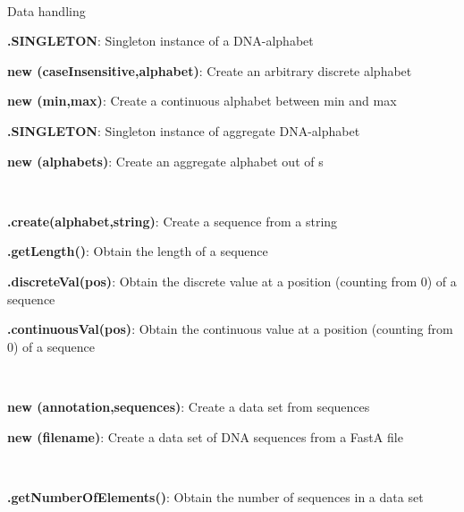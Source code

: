 \documentclass[10pt]{scrartcl}
\newcommand{\entry}[3]{{\bfseries #1#2}: #3}
\begin{document}
\thispagestyle{empty}


\renewcommand{\section}[1]{{
~\vspace{-0.1cm}

\large\sfb #1\vspace{0.1cm}\\}


}
\begin{flushleft}
\footnotesize
\section{Data handling}

\entry{\DNAAlphabet}{.SINGLETON}{Singleton instance of a DNA-alphabet}

\entry{new \DiscreteAlphabet}{(caseInsensitive,alphabet)}{Create an arbitrary discrete alphabet}

\entry{new \ContinuousAlphabet}{(min,max)}{Create a continuous alphabet between min and max}

\entry{\DNAAlphabetContainer}{.SINGLETON}{Singleton instance of aggregate DNA-alphabet}

\entry{new \AlphabetContainer}{(alphabets)}{Create an aggregate alphabet out of \Alphabet s}

~

\entry{\Sequence}{.create(alphabet,string)}{Create a sequence from a string}

\entry{\Sequence}{.getLength()}{Obtain the length of a sequence}

\entry{\Sequence}{.discreteVal(pos)}{Obtain the discrete value at a position (counting from 0) of a sequence}

\entry{\Sequence}{.continuousVal(pos)}{Obtain the continuous value at a position (counting from 0) of a sequence}

~

\entry{new \DataSet}{(annotation,sequences)}{Create a data set from sequences}

\entry{new \DNADataSet}{(filename)}{Create a data set of DNA sequences from a FastA file}

~

\entry{\DataSet}{.getNumberOfElements()}{Obtain the number of sequences in a data set}


\end{flushleft}
\end{document}
